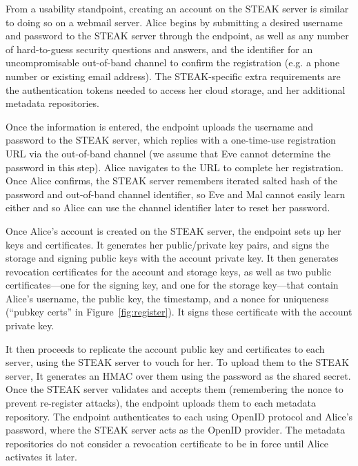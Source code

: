 From a usability standpoint, creating an account on the STEAK server is similar to doing so on a webmail server.  Alice begins by submitting a desired username and password to the STEAK server through the endpoint, as well as any number of hard-to-guess security questions and answers, and the identifier for an uncompromisable out-of-band channel to confirm the registration (e.g. a phone number or existing email address).  The STEAK-specific extra requirements are the authentication tokens needed to access her cloud storage, and her additional metadata repositories.

Once the information is entered, the endpoint uploads the username and password to the STEAK server, which replies with a one-time-use registration URL via the out-of-band channel (we assume that Eve cannot determine the password in this step).  Alice navigates to the URL to complete her registration.  Once Alice confirms, the STEAK server remembers iterated salted hash of the password and out-of-band channel identifier, so Eve and Mal cannot easily learn either and so Alice can use the channel identifier later to reset her password.

Once Alice's account is created on the STEAK server, the endpoint sets up her keys and certificates.  It generates her public/private key pairs, and signs the storage and signing public keys with the account private key.  It then generates revocation certificates for the account and storage keys, as well as two public certificates---one for the signing key, and one for the storage key---that contain Alice's username, the public key, the timestamp, and a nonce for uniqueness (``pubkey certs'' in Figure~\ref{fig:register}).  It signs these certificate with the account private key.

It then proceeds to replicate the account public key and certificates to each server, using the STEAK server to vouch for her.  To upload them to the STEAK server, It generates an HMAC over them using the password as the shared secret.  Once the STEAK server validates and accepts them (remembering the nonce to prevent re-register attacks), the endpoint uploads them to each metadata repository.  The endpoint authenticates to each using OpenID protocol and Alice's password, where the STEAK server acts as the OpenID provider.  The metadata repositories do not consider a revocation certificate to be in force until Alice activates it later.

